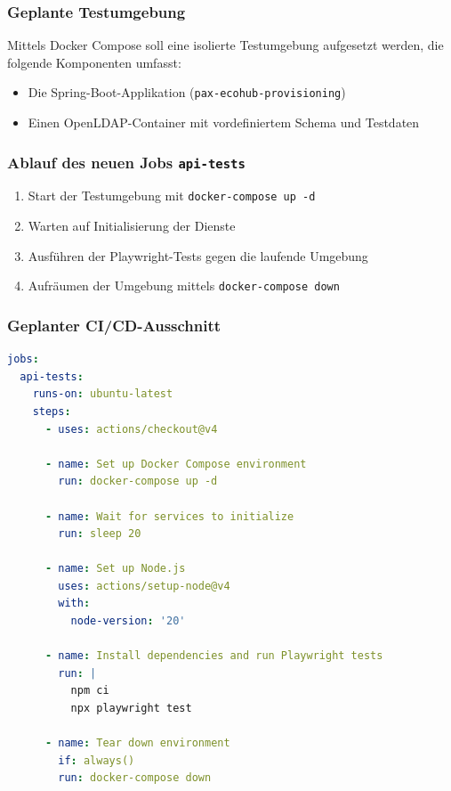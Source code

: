 \subsubsection*{Geplante Testumgebung}

Mittels Docker Compose soll eine isolierte Testumgebung aufgesetzt werden, die folgende Komponenten umfasst:

\begin{itemize}
  \item Die Spring-Boot-Applikation (\texttt{pax-ecohub-provisioning})
  \item Einen OpenLDAP-Container mit vordefiniertem Schema und Testdaten
\end{itemize}

\subsubsection*{Ablauf des neuen Jobs \texttt{api-tests}}

\begin{enumerate}
  \item Start der Testumgebung mit \texttt{docker-compose up -d}
  \item Warten auf Initialisierung der Dienste
  \item Ausführen der Playwright-Tests gegen die laufende Umgebung
  \item Aufräumen der Umgebung mittels \texttt{docker-compose down}
\end{enumerate}

\subsubsection*{Geplanter CI/CD-Ausschnitt}

\begin{lstlisting}[language=yaml, caption={Entwurf: CI/CD-Job für E2E-Tests}]
jobs:
  api-tests:
    runs-on: ubuntu-latest
    steps:
      - uses: actions/checkout@v4

      - name: Set up Docker Compose environment
        run: docker-compose up -d

      - name: Wait for services to initialize
        run: sleep 20

      - name: Set up Node.js
        uses: actions/setup-node@v4
        with:
          node-version: '20'

      - name: Install dependencies and run Playwright tests
        run: |
          npm ci
          npx playwright test

      - name: Tear down environment
        if: always()
        run: docker-compose down
\end{lstlisting}

